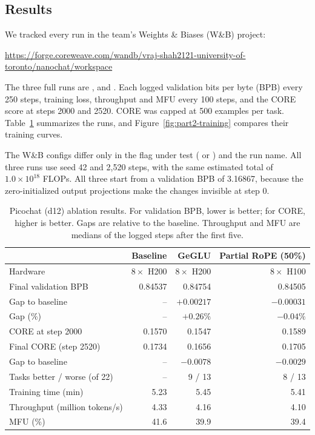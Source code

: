 
\subsection*{Results}

We tracked every run in the team's Weights \& Biases (W\&B) project:
\begin{center}
\small\url{https://forge.coreweave.com/wandb/vraj-shah2121-university-of-toronto/nanochat/workspace}
\end{center}
The three full runs are ,  and . Each logged validation bits per byte (BPB) every 250 steps, training loss, throughput and MFU every 100 steps, and the CORE score at steps 2000 and 2520. CORE was capped at 500 examples per task. Table~\ref{tab:part2-results} summarizes the runs, and Figure~\ref{fig:part2-training} compares their training curves.

The W\&B configs differ only in the flag under test ( or ) and the run name. All three runs use seed 42 and 2,520 steps, with the same estimated total of $1.0 \times 10^{18}$ FLOPs. All three start from a validation BPB of 3.16867, because the zero-initialized output projections make the changes invisible at step 0.

\begin{table}[H]
\centering
\caption{Picochat (d12) ablation results. For validation BPB, lower is better; for CORE, higher is better. Gaps are relative to the baseline. Throughput and MFU are medians of the logged steps after the first five.}
\label{tab:part2-results}
\begin{tabular}{@{}lrrr@{}}
\toprule
 & Baseline & GeGLU & Partial RoPE (50\%) \\
\midrule
Hardware & $8 \times$ H200 & $8 \times$ H200 & $8 \times$ H100 \\
Final validation BPB & 0.84537 & 0.84754 & 0.84505 \\
\quad Gap to baseline & -- & $+0.00217$ & $-0.00031$ \\
\quad Gap (\%) & -- & $+0.26\%$ & $-0.04\%$ \\
CORE at step 2000 & 0.1570 & 0.1547 & 0.1589 \\
Final CORE (step 2520) & 0.1734 & 0.1656 & 0.1705 \\
\quad Gap to baseline & -- & $-0.0078$ & $-0.0029$ \\
\quad Tasks better / worse (of 22) & -- & 9 / 13 & 8 / 13 \\
Training time (min) & 5.23 & 5.45 & 5.41 \\
Throughput (million tokens/s) & 4.33 & 4.16 & 4.10 \\
MFU (\%) & 41.6 & 39.9 & 39.4 \\
\bottomrule
\end{tabular}
\end{table}

